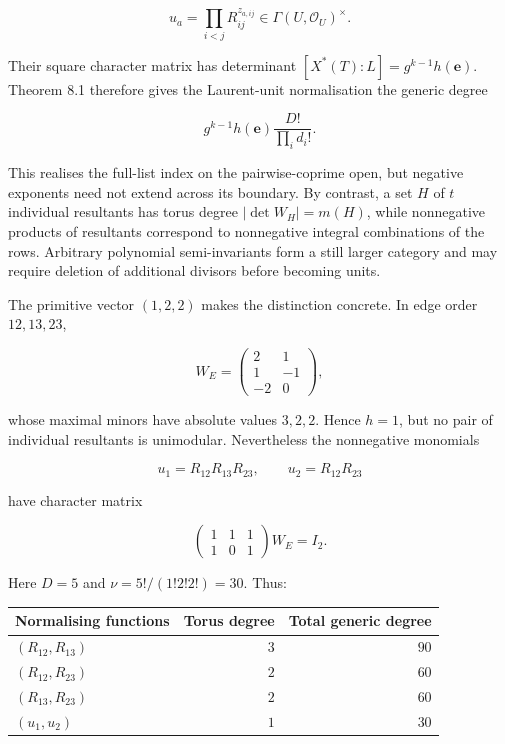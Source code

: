 \documentclass[
  11pt,
  a4paper,
]{article}
\newcounter{none} %
\begin{document}
\[
 u_a=\prod_{i<j}R_{ij}^{z_{a,ij}}\in\Gamma(U,\mathcal O_U)^\times.
\]

Their square character matrix has determinant
\([X^*(T):L]=g^{k-1}h(\mathbf e)\). Theorem 8.1 therefore gives the
Laurent-unit normalisation the generic degree

\[
 g^{k-1}h(\mathbf e)\frac{D!}{\prod_i d_i!}.
\tag{8.5}
\]

This realises the full-list index on the pairwise-coprime open, but
negative exponents need not extend across its boundary. By contrast, a
set \(H\) of \(t\) individual resultants has torus degree
\(|\det W_H|=m(H)\), while nonnegative products of resultants correspond
to nonnegative integral combinations of the rows. Arbitrary polynomial
semi-invariants form a still larger category and may require deletion of
additional divisors before becoming units.

The primitive vector \((1,2,2)\) makes the distinction concrete. In edge
order \(12,13,23\),

\[
 W_E=
 \begin{pmatrix}
 2&1\\1&-1\\-2&0
 \end{pmatrix},
\]

whose maximal minors have absolute values \(3,2,2\). Hence \(h=1\), but
no pair of individual resultants is unimodular. Nevertheless the
nonnegative monomials

\[
 u_1=R_{12}R_{13}R_{23},\qquad u_2=R_{12}R_{23}
\]

have character matrix

\[
 \begin{pmatrix}1&1&1\\1&0&1\end{pmatrix}W_E=I_2.
\tag{8.6}
\]

Here \(D=5\) and \(\nu=5!/(1!2!2!)=30\). Thus:

{\def\LTcaptype{none} %
\begin{longtable}[]{@{}lrr@{}}
\toprule\noalign{}
Normalising functions & Torus degree & Total generic degree \\
\midrule\noalign{}
\endhead
\bottomrule\noalign{}
\endlastfoot
\((R_{12},R_{13})\) & \(3\) & \(90\) \\
\((R_{12},R_{23})\) & \(2\) & \(60\) \\
\((R_{13},R_{23})\) & \(2\) & \(60\) \\
\((u_1,u_2)\) & \(1\) & \(30\) \\
\end{longtable}
}
\end{document}
